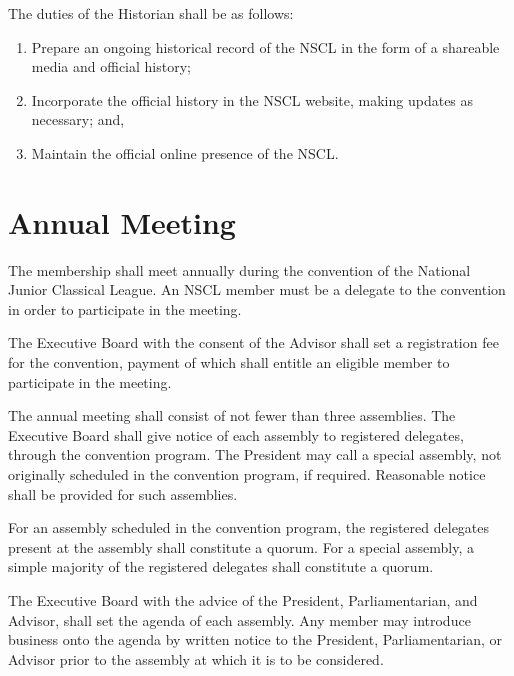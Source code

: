 \documentclass{bylaws}
\newcommand{\NSCL}{\textsc{NSCL}\xspace}
\begin{document}
\begin{linenumbers}[1]
\begin{enumerate}
    \sub[Historian] The duties of the Historian shall be as follows:
    \begin{enumerate}
    \item Prepare an ongoing historical record of the \NSCL in the form
      of a shareable media and official history;
    \item Incorporate the official history in the \NSCL website, making
      updates as necessary; and,
    \item Maintain the official online presence of the \NSCL.\\
    \end{enumerate}
  \end{enumerate}


  \section{Annual Meeting} 
  The membership shall meet annually during the convention of the
  National Junior Classical League. An \NSCL member must be a delegate
  to the convention in order to participate in the meeting.
  \begin{enumerate}
     The Executive Board with the consent of the
    Advisor shall set a registration fee for the convention, payment of
    which shall entitle an eligible member to participate in the
    meeting.
    
    \sub[Assemblies] The annual meeting shall consist of not fewer than
    three assemblies. The Executive Board shall give notice of each
    assembly to registered delegates, through the convention program. The
    President may call a special assembly, not originally scheduled in
    the convention program, if required. Reasonable notice shall be
    provided for such assemblies.
    
    \sub[Quorum] For an assembly scheduled in the convention program,
    the registered delegates present at the assembly shall constitute a
    quorum. For a special assembly, a simple majority of the registered
    delegates shall constitute a quorum.
    
    \sub[Agenda] The Executive Board with the advice of the President,
    Parliamentarian, and Advisor, shall set the agenda of each
    assembly. Any member may introduce business onto the agenda by
    written notice to the President,  Parliamentarian, or Advisor prior
    to the assembly at which it is to be considered.\\ 
  \end{enumerate}


\end{linenumbers}
\end{document}
